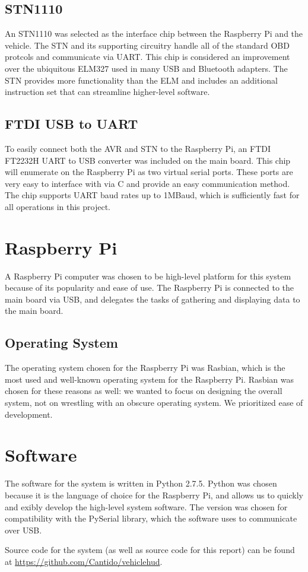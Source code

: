 \subsection{STN1110}
An STN1110 was selected as the interface chip between the Raspberry Pi and the 
vehicle.  The STN and its supporting circuitry handle all of the standard OBD
protcols and communicate via UART.  This chip is considered an improvement over
the ubiquitous ELM327 used in many USB and Bluetooth adapters.  The STN provides
more functionality than the ELM and includes an additional instruction set that
can streamline higher-level software.

\subsection{FTDI USB to UART}
To easily connect both the AVR and STN to the Raspberry Pi, an FTDI FT2232H UART 
to USB converter was included on the main board.  This chip will enumerate on the
Raspberry Pi as two virtual serial ports.  These ports are very easy to interface
with via C and provide an easy communication method.  The chip supports UART baud
rates up to 1MBaud, which is sufficiently fast for all operations in this project.

\section{Raspberry Pi}

A Raspberry Pi computer was chosen to be high-level platform for this system
because of its popularity and ease of use. The Raspberry Pi is connected to the
main board via USB, and delegates the tasks of gathering and displaying data
to the main board.

\subsection{Operating System}
The operating system chosen for the Raspberry Pi was Rasbian, which is the
most used and well-known operating system for the Raspberry Pi. Rasbian was
chosen for these reasons as well: we wanted to focus on designing the overall
system, not on wrestling with an obscure operating system. We prioritized ease
of development.

\section{Software}
The software for the system is written in Python 2.7.5. Python was chosen
because it is the language of choice for the Raspberry Pi, and allows us to
quickly and 
exibly develop the high-level system software. The version was
chosen for compatibility with the PySerial library, which the software uses to
communicate over USB.

Source code for the system (as well as source code for this report) can be
found at \url{https://github.com/Cantido/vehiclehud}.

